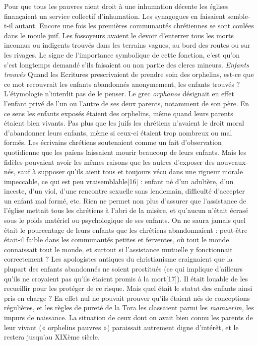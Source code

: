  Pour que tous les pauvres aient droit à une inhumation décente les églises finançaient un service collectif d'inhumation. Les synagogues en faisaient semble-t-il autant. Encore une fois les premières communautés chrétiennes se sont coulées dans le moule juif. Les fossoyeurs avaient le devoir d'enterrer tous les morts inconnus ou indigents trouvés dans les terrains vagues, au bord des routes ou sur les rivages. Le signe de l'importance symbolique de cette fonction, c'est qu'on s'est longtemps demandé s'ils faisaient ou non partie des clercs mineurs. 
\emph{Enfants trouvés
}Quand les Ecritures prescrivaient de prendre soin des orphelins, est-ce que ce mot recouvrait les enfants abandonnés anonymement, les enfants trouvés ? L'étymologie n'interdit pas de le penser. Le grec \emph{orphanos} désignait en effet l'enfant privé de l'un ou l'autre de ses deux parents, notamment de son père. En ce sens les enfants exposés étaient des orphelins, même quand leurs parents étaient bien vivants. Pas plus que les juifs les chrétiens n'avaient le droit moral d'abandonner leurs enfants, même si ceux-ci étaient trop nombreux ou mal formés. Les écrivains chrétiens soutenaient comme un fait d'observation quotidienne que les païens laissaient mourir beaucoup de leurs enfants. Mais les fidèles pouvaient avoir les mêmes raisons que les autres d'exposer des nouveaux-nés, sauf à supposer qu'ils aient tous et toujours vécu dans une rigueur morale impeccable, ce qui est peu vraisemblable[16] : enfant né d'un adultère, d'un inceste, d'un viol, d'une rencontre sexuelle sans lendemain, difficulté d'accepter un enfant mal formé, etc. Rien ne permet non plus d'assurer que l'assistance de l'église mettait tous les chrétiens à l'abri de la misère, et qu'aucun n'était écrasé sous le poids matériel ou psychologique de ses enfants. On ne saura jamais quel était le pourcentage de leurs enfants que les chrétiens abandonnaient : peut-être était-il faible dans les communautés petites et ferventes, où tout le monde connaissait tout le monde, et surtout si l'assistance mutuelle y fonctionnait correctement ? 
 Les apologistes antiques du christianisme craignaient que la plupart des enfants abandonnés ne soient prostitués (ce qui implique d'ailleurs qu'ils ne croyaient pas qu'ils étaient promis à la mort[17]). Il était louable de les recueillir pour les protéger de ce risque. Mais quel était le statut des enfants ainsi pris en charge ? En effet nul ne pouvait prouver qu'ils étaient nés de conceptions régulières, et les règles de pureté de la Tora les classaient parmi les \emph{mamzerim,} les impurs de naissance. La situation de ceux dont on avait bien connu les parents de leur vivant (« orphelins pauvres ») paraissait autrement digne d'intérêt, et le restera jusqu'au XIXème siècle. 
